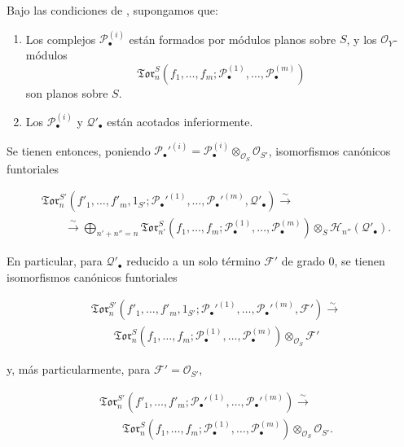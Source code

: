 \begin{corollary}[6.9.6]
\label{III.6.9.6}
Bajo las condiciones de , supongamos que:
\begin{enumerate}
  \item[$1^\circ$] Los complejos $\mathscr P_\bullet^{(i)}$ están formados
  por módulos planos sobre $S$, y los $\mathscr O_Y$-módulos
  \[
    \mathfrak{Tor}_n^S
    (f_1,\ldots,f_m;
     \mathscr P_\bullet^{(1)},\ldots,\mathscr P_\bullet^{(m)})
  \]
  son planos sobre $S$.
  \item[$2^\circ$] Los $\mathscr P_\bullet^{(i)}$ y
  $\mathscr Q'_\bullet$ están acotados inferiormente.
\end{enumerate}

Se tienen entonces, poniendo
$\mathscr P_\bullet'^{(i)}=
\mathscr P_\bullet^{(i)}\otimes_{\mathscr O_S}\mathscr O_{S'}$,
isomorfismos canónicos funtoriales

\label{III.6.9.6.1}
\[
\begin{split}
  &\mathfrak{Tor}_n^{S'}
  (f'_1,\ldots,f'_m,1_{S'};
   \mathscr P_\bullet'^{(1)},\ldots,
   \mathscr P_\bullet'^{(m)},\mathscr Q'_\bullet)
  \xrightarrow{\sim}\\
  &\qquad\xrightarrow{\sim}
  \bigoplus_{n'+n''=n}
  \mathfrak{Tor}_{n'}^S
  (f_1,\ldots,f_m;
   \mathscr P_\bullet^{(1)},\ldots,
   \mathscr P_\bullet^{(m)})
  \otimes_S\mathscr H_{n''}(\mathscr Q'_\bullet).
\end{split}
\tag{6.9.6.1}\label{III.6.9.6.1.fr}
\]

En particular, para $\mathscr Q'_\bullet$ reducido a un solo término
$\mathscr F'$ de grado $0$, se tienen isomorfismos canónicos funtoriales

\label{III.6.9.6.2}
\[
\begin{split}
  &\mathfrak{Tor}_n^{S'}
  (f'_1,\ldots,f'_m,1_{S'};
   \mathscr P_\bullet'^{(1)},\ldots,
   \mathscr P_\bullet'^{(m)},\mathscr F')
  \xrightarrow{\sim}\\
  &\qquad
  \mathfrak{Tor}_n^S
  (f_1,\ldots,f_m;
   \mathscr P_\bullet^{(1)},\ldots,
   \mathscr P_\bullet^{(m)})
  \otimes_{\mathscr O_S}\mathscr F'
\end{split}
\tag{6.9.6.2}\label{III.6.9.6.2.fr}
\]

y, más particularmente, para $\mathscr F'=\mathscr O_{S'}$,

\label{III.6.9.6.3}
\[
\begin{split}
  &\mathfrak{Tor}_n^{S'}
  (f'_1,\ldots,f'_m;
   \mathscr P_\bullet'^{(1)},\ldots,
   \mathscr P_\bullet'^{(m)})
  \xrightarrow{\sim}\\
  &\qquad
  \mathfrak{Tor}_n^S
  (f_1,\ldots,f_m;
   \mathscr P_\bullet^{(1)},\ldots,
   \mathscr P_\bullet^{(m)})
  \otimes_{\mathscr O_S}\mathscr O_{S'}.
\end{split}
\tag{6.9.6.3}\label{III.6.9.6.3.fr}
\]

\end{corollary}

